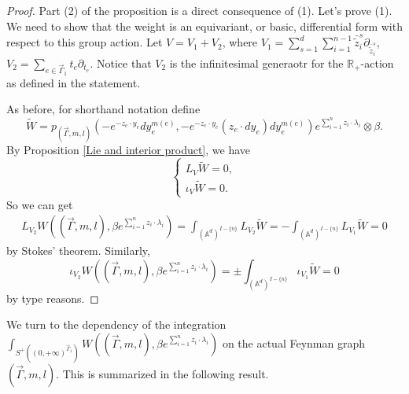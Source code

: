 \documentclass[11pt]{amsart}
\theoremstyle{definition}
\theoremstyle{remark}
\numberwithin{equation}{section}
\begin{document}
\begin{proof}
  Part (2) of the proposition is a direct consequence of (1). Let's prove (1).
We need to show that the weight is an equivariant, or basic, differential form with respect to this group action. 
    Let $ V= V_{1}+ V_{2}$, where $ V_{1}=\sum_{s=1}^{d}\sum_{i=1}^{n-1}\bar{\tilde{z}}_{i}^{s}
    \partial_{\bar{\tilde{z}}_{i}^{s}}$, $ V_{2}=\sum_{e\in\vec{\Gamma}_{1}}t_{e}\partial_{t_{e}}$. 
    Notice that $V_2$ is the infinitesimal generaotr for the $\mathbb{R}_+$-action as defined in the statement. 

    As before, for
    shorthand notation define
    $$
    \tilde{W}=p_{(\vec{\Gamma},m,l)}(-e^{-z_{e}\cdot y_{e}}dy_{e}^{m(e)},-e^{-z_{e}\cdot y_{e}}(z_{e}\cdot dy_{e})dy_{e}^{m(e)})e^{\sum_{i=1}^{n}z_{i}\cdot\lambda_{i}}\otimes \beta.
    $$
    By Proposition \ref{Lie and interior product}, we have
    $$
    \begin{cases}
        L_{ V}\tilde{W}=0,\\
        \iota_{ V}\tilde{W}=0.
    \end{cases}
    $$
    So we can get 
    \begin{align*}
        L_{ V_{2}}W((\vec{\Gamma},m,l),\beta e^{\sum_{i=1}^{n}z_{i}\cdot\lambda_{i}})=\int_{(\mathbb{A}^{d})^{ I-\{n\}}}L_{ V_{2}}\tilde{W}=-\int_{(\mathbb{A}^{d})^{ I-\{n\}}}L_{ V_{1}}\tilde{W}=0
    \end{align*}
    by Stokes' theorem.
    Similarly,
    $$
    \iota_{ V_{2}}W((\vec{\Gamma},m,l),\beta e^{\sum_{i=1}^{n}z_{i}\cdot\lambda_{i}})=\pm\int_{(\mathbb{A}^{d})^{ I-\{n\}}}\iota_{ V_{1}}\tilde{W}=0
    $$
    by type reasons.
\end{proof}
We turn to the dependency of the integration $\int_{S^{+}((0,+\infty)^{\vec{\Gamma}_{1}})}W((\vec{\Gamma},m,l),\beta
e^{\sum_{i=1}^{n}z_{i}\cdot\lambda_{i}})$ on the actual Feynman graph $(\vec{\Gamma},m,l)$. 
This is summarized in the following result.
\end{document}

